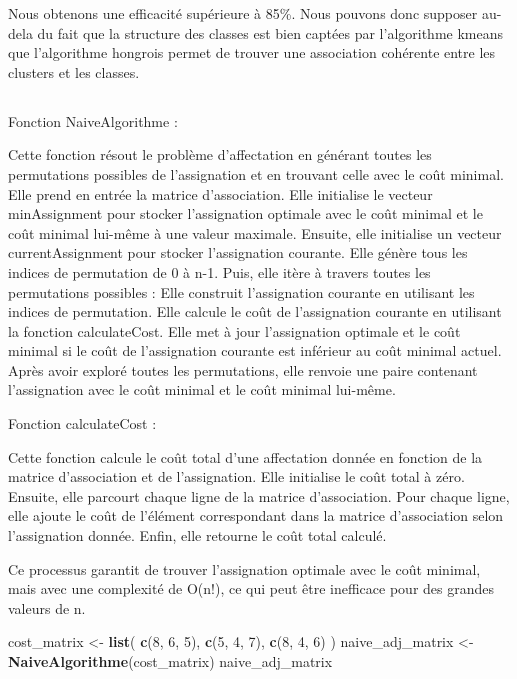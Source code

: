 \documentclass[
]{article}
\newenvironment{Shaded}{\begin{snugshade}}{\end{snugshade}}
\newcommand{\DecValTok}[1]{\textcolor[rgb]{0.00,0.00,0.81}{#1}}
\newcommand{\FunctionTok}[1]{\textcolor[rgb]{0.13,0.29,0.53}{\textbf{#1}}}
\newcommand{\NormalTok}[1]{#1}
\newcommand{\OtherTok}[1]{\textcolor[rgb]{0.56,0.35,0.01}{#1}}
\begin{document}
Nous obtenons une efficacité supérieure à 85\%. Nous pouvons donc
supposer au-dela du fait que la structure des classes est bien captées
par l'algorithme kmeans que l'algorithme hongrois permet de trouver une
association cohérente entre les clusters et les classes.

\hypertarget{section-19}{%
\subsection{}\label{section-19}}

Fonction NaiveAlgorithme :

Cette fonction résout le problème d'affectation en générant toutes les
permutations possibles de l'assignation et en trouvant celle avec le
coût minimal. Elle prend en entrée la matrice d'association. Elle
initialise le vecteur minAssignment pour stocker l'assignation optimale
avec le coût minimal et le coût minimal lui-même à une valeur maximale.
Ensuite, elle initialise un vecteur currentAssignment pour stocker
l'assignation courante. Elle génère tous les indices de permutation de 0
à n-1. Puis, elle itère à travers toutes les permutations possibles :
Elle construit l'assignation courante en utilisant les indices de
permutation. Elle calcule le coût de l'assignation courante en utilisant
la fonction calculateCost. Elle met à jour l'assignation optimale et le
coût minimal si le coût de l'assignation courante est inférieur au coût
minimal actuel. Après avoir exploré toutes les permutations, elle
renvoie une paire contenant l'assignation avec le coût minimal et le
coût minimal lui-même.

Fonction calculateCost :

Cette fonction calcule le coût total d'une affectation donnée en
fonction de la matrice d'association et de l'assignation. Elle
initialise le coût total à zéro. Ensuite, elle parcourt chaque ligne de
la matrice d'association. Pour chaque ligne, elle ajoute le coût de
l'élément correspondant dans la matrice d'association selon
l'assignation donnée. Enfin, elle retourne le coût total calculé.

Ce processus garantit de trouver l'assignation optimale avec le coût
minimal, mais avec une complexité de O(n!), ce qui peut être inefficace
pour des grandes valeurs de n.

\begin{Shaded}
\begin{Highlighting}[]
\NormalTok{cost\_matrix }\OtherTok{\textless{}{-}} \FunctionTok{list}\NormalTok{(}
  \FunctionTok{c}\NormalTok{(}\DecValTok{8}\NormalTok{, }\DecValTok{6}\NormalTok{, }\DecValTok{5}\NormalTok{),}
  \FunctionTok{c}\NormalTok{(}\DecValTok{5}\NormalTok{, }\DecValTok{4}\NormalTok{, }\DecValTok{7}\NormalTok{),}
  \FunctionTok{c}\NormalTok{(}\DecValTok{8}\NormalTok{, }\DecValTok{4}\NormalTok{, }\DecValTok{6}\NormalTok{)}
\NormalTok{)}
\NormalTok{naive\_adj\_matrix }\OtherTok{\textless{}{-}} \FunctionTok{NaiveAlgorithme}\NormalTok{(cost\_matrix)}
\NormalTok{naive\_adj\_matrix}
\end{Highlighting}
\end{Shaded}
\end{document}
